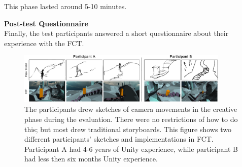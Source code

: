 This phase lasted around 5-10 minutes.

\textbf{Post-test Questionnaire}\\
Finally, the test participants answered a short questionnaire about their experience with the FCT.

\begin{figure}[htbp]
\centering
\includegraphics[width=0.9\textwidth]{Pics/Sketching_FramingsNew}
\caption{The participants drew sketches of camera movements in the creative phase during the evaluation. There were no restrictions of how to do this; but most drew traditional storyboards. This figure shows two different participants' sketches and implementations in FCT. Participant A had 4-6 years of Unity experience, while participant B had less then six months Unity experience.}
\label{fig:Sketching_Framings}
\end{figure}